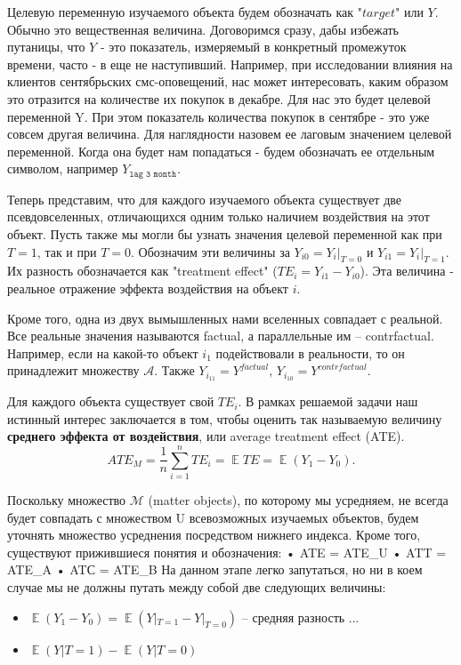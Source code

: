 \documentclass{article}
\DeclareMathOperator{\E}{\mathbb{E}}
\begin{document}
        Целевую переменную изучаемого объекта будем обозначать как "$target$"{} или $Y$. Обычно это вещественная величина. Договоримся сразу, дабы избежать путаницы, что $Y$ - это показатель, измеряемый в конкретный промежуток времени, часто - в еще не наступивший. Например, при исследовании влияния на клиентов сентябрьских смс-оповещений, нас может интересовать, каким образом это отразится на количестве их покупок в декабре. Для нас это будет целевой переменной Y. При этом показатель количества покупок в сентябре - это уже совсем другая величина. Для наглядности назовем ее лаговым значением целевой переменной. Когда она будет нам попадаться - будем обозначать ее отдельным символом, например $Y_\texttt{lag 3 month}$.

        Теперь представим, что для каждого изучаемого объекта существует две псевдовселенных, отличающихся одним только наличием воздействия на этот объект. Пусть также мы могли бы узнать значения целевой переменной как при $T=1$, так и при $T=0$. Обозначим эти величины за $Y_{i0} = Y_i|_{T=0}$ и  $Y_{i1}=Y_i|_{T=1}$. Их разность обозначается как "treatment effect" ($TE_i=Y_{i1}-Y_{i0}$). Эта величина - реальное отражение эффекта воздействия на объект $i$.


        Кроме того, одна из двух вымышленных нами вселенных совпадает с реальной. Все реальные значения называются factual, а параллельные им – contrfactual. Например, если на какой-то объект $i_1$ подействовали в реальности, то он принадлежит множеству $\mathcal{A}$. Также $Y_{i_11} = Y^{factual},\, Y_{i_10} = Y^{contrfactual}$.

        Для каждого объекта существует свой $TE_i$. В рамках решаемой задачи наш истинный интерес заключается в том, чтобы оценить так называемую величину \textbf{среднего эффекта от воздействия}, или average treatment effect (ATE).
                $$
                    ATE_M=
                    \frac{1}{n}\displaystyle\sum_{i=1}^nTE_i=
                    \E{}TE=
                    \E{}(Y_1-Y_0).
                $$

        Поскольку множество $\mathcal{M}$ (matter objects), по которому мы усредняем, не всегда будет совпадать с множеством U всевозможных изучаемых объектов, будем уточнять множество усреднения посредством нижнего индекса. Кроме того, существуют прижившиеся понятия и обозначения:
        •       ATE = ATE_U
        •       ATT = ATE_A
        •       ATС = ATE_B
                На данном этапе легко запутаться, но ни в коем случае мы не должны путать между собой две следующих величины:
                \begin{itemize}
                  \item $\E{}(Y_1-Y_0) = \E{}(Y|_{T=1}-Y|_{T=0})$ -- средняя разность ...
                  \item $\E{}(Y|T=1) - \E{}(Y|T=0)$
                \end{itemize}
\end{document}
